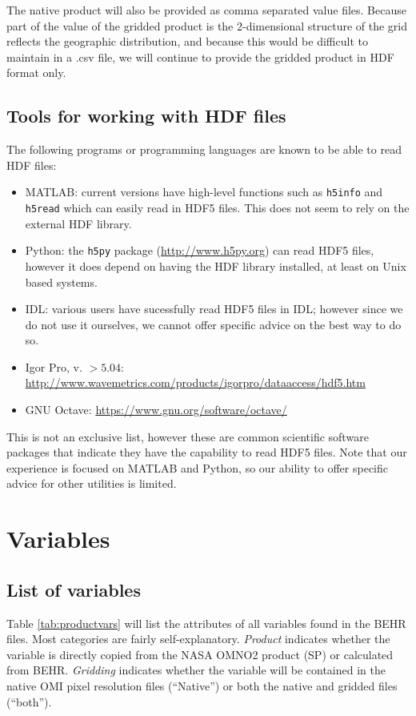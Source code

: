 \documentclass[12pt]{article}
\begin{document}
	The native product will also be provided as comma separated value files. Because part of the value of the gridded product is the 2-dimensional structure of the grid reflects the geographic distribution, and because this would be difficult to maintain in a .csv file, we will continue to provide the gridded product in HDF format only.
	
	\subsection{Tools for working with HDF files}
	The following programs or programming languages are known to be able to read HDF files:
	\begin{itemize}
		\item MATLAB: current versions have high-level functions such as \texttt{h5info} and \texttt{h5read} which can easily read in HDF5 files. This does not seem to rely on the external HDF library.
		\item Python: the \texttt{h5py} package (\url{http://www.h5py.org}) can read HDF5 files, however it does depend on having the HDF library installed, at least on Unix based systems. 
		\item IDL: various users have sucessfully read HDF5 files in IDL; however since we do not use it ourselves, we cannot offer specific advice on the best way to do so. 
		\item Igor Pro, v. $>5.04$: \url{http://www.wavemetrics.com/products/igorpro/dataaccess/hdf5.htm}
		\item GNU Octave: \url{https://www.gnu.org/software/octave/}
	\end{itemize}
	
	This is not an exclusive list, however these are common scientific software packages that indicate they have the capability to read HDF5 files. Note that our experience is focused on MATLAB and Python, so our ability to offer specific advice for other utilities is limited.
	
	
\section{Variables}
\subsection{List of variables}
	Table \ref{tab:productvars} will list the attributes of all variables found in the BEHR files. Most categories are fairly self-explanatory. \emph{Product} indicates whether the variable is directly copied from the NASA OMNO2 product (SP) or calculated from BEHR. \emph{Gridding} indicates whether the variable will be contained in the native OMI pixel resolution files (``Native'') or both the native and gridded files (``both'').
	
\end{document}
